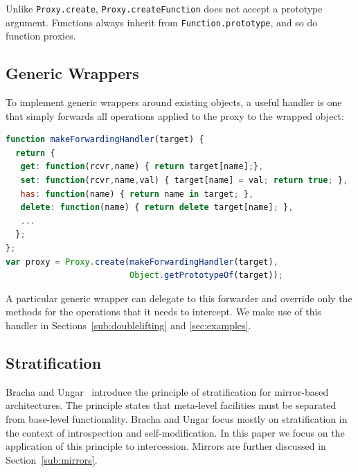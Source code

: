\documentclass{sig-alternate}
\begin{document}
Unlike \texttt{Proxy.create}, \texttt{Proxy.createFunction} does not accept a prototype argument. Functions always inherit from \texttt{Function.prototype}, and so do function proxies.


\subsection{Generic Wrappers}
\label{sub:wrappers}

To implement generic wrappers around existing objects, a useful handler is one that simply forwards all operations applied to the proxy to the wrapped object:

\begin{lstlisting}[language=javascript]
function makeForwardingHandler(target) {
  return {
   get: function(rcvr,name) { return target[name];},
   set: function(rcvr,name,val) { target[name] = val; return true; },
   has: function(name) { return name in target; },
   delete: function(name) { return delete target[name]; },
   ...
  };
};
var proxy = Proxy.create(makeForwardingHandler(target),
                         Object.getPrototypeOf(target));
\end{lstlisting}

A particular generic wrapper can delegate to this forwarder and override only the methods for the operations that it needs to intercept. We make use of this handler in Sections~\ref{sub:doublelifting} and \ref{sec:examples}.

\subsection{Stratification}
\label{sub:stratification}

Bracha and Ungar~\cite{bracha04mirrors} introduce the principle of stratification for mirror-based architectures. The principle states that meta-level facilities must be separated from base-level functionality. Bracha and Ungar focus mostly on stratification in the context of introspection and self-modification. In this paper we focus on the application of this principle to intercession. Mirrors are further discussed in Section~\ref{sub:mirrors}.
\end{document}
